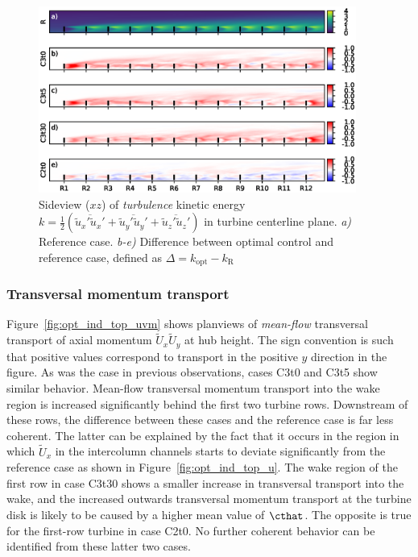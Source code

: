 		\begin{figure}[hbt]
			\centering
			\includegraphics[width=0.93\textwidth]{chapters/optimal_induction_control/sideview_tke_side.eps}
			\caption{Sideview ($xz$) of \emph{turbulence} kinetic energy $k = \frac{1}{2}(\overline{\widetilde{u}_x'\widetilde{u}_x'} + \overline{\widetilde{u}_y'\widetilde{u}_y'} + \overline{\widetilde{u}_z'\widetilde{u}_z'})$ in turbine centerline plane. \emph{a) } Reference case. \emph{b-e)} Difference between optimal control and reference case, defined as $\Delta = k_{\text{opt}} - k_{\text{R}}$  \label{fig:opt_ind_top_tke}}
		\end{figure}

	\subsubsection{Transversal momentum transport}
	
		Figure~\ref{fig:opt_ind_top_uvm} shows planviews of  \emph{mean-flow} transversal transport of axial momentum $\widetilde{U}_x \widetilde{U}_y$ at hub height. The sign convention is such that positive values correspond to transport in the positive $y$ direction in the figure. As was the case in previous observations, cases C3t0 and C3t5 show similar behavior. Mean-flow transversal momentum transport into the wake region is increased significantly behind the first two turbine rows. Downstream of these rows, the difference between these cases and the reference case is far less coherent. The latter can be explained by the fact that it occurs in the region in which $\widetilde{U}_x$ in the intercolumn channels starts to deviate significantly from the reference case as shown in Figure~\ref{fig:opt_ind_top_u}. The wake region of the first row in case C3t30 shows a smaller increase in transversal transport into the wake, and the increased outwards transversal momentum transport at the turbine disk is likely to be caused by a higher mean value of $\cthat$. The opposite is true for the first-row turbine in case C2t0. No further coherent behavior can be identified from these latter two cases.
	
